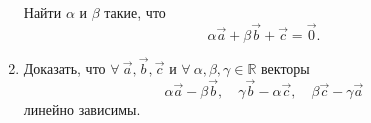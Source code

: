 \begin{enumerate}
	 Найти $\alpha$ и $\beta$ такие, что
	 $$\alpha \vec a + \beta \vec b + \vec c = \vec 0.$$
	 
	 \item Доказать, что $\forall\ {\vec a, \vec b, \vec c}$ и $\forall\ {\alpha, \beta, \gamma} \in \mathbb{R}$ векторы
	 $$\alpha \vec a - \beta \vec b,\quad \gamma \vec b -\alpha \vec c, \quad \beta \vec c - \gamma \vec a$$
	 линейно зависимы.
\end{enumerate}